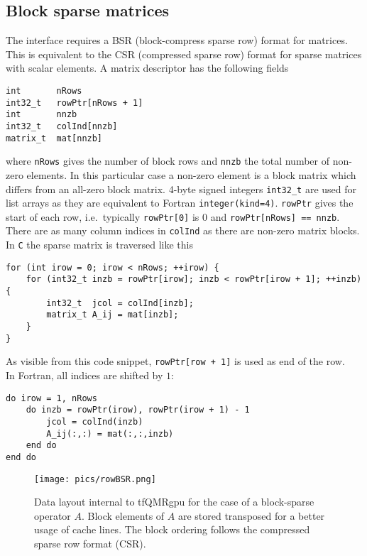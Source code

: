 \documentclass[oribibl]{llncs}
\newcommand{\ttt}[1]{\texttt{#1}}
\begin{document}
\subsection{Block sparse matrices} \label{sec:bsr}
%
The interface requires a BSR (block-compress sparse row) format for matrices.
This is equivalent to the CSR (compressed sparse row) format for sparse matrices with scalar elements.
A matrix descriptor has the following fields
\begin{verbatim}
int       nRows
int32_t   rowPtr[nRows + 1] 
int       nnzb 
int32_t   colInd[nnzb]
matrix_t  mat[nnzb]
\end{verbatim}
where \ttt{nRows} gives the number of block rows and \ttt{nnzb} the total number of non-zero elements.
In this particular case a non-zero element is a block matrix which differs from an all-zero block matrix.
4-byte signed integers \ttt{int32\_t} are used for list arrays as they are equivalent to Fortran \ttt{integer(kind=4)}.
\ttt{rowPtr} gives the start of each row, i.e.~typically \ttt{rowPtr[0]} is $0$ and \ttt{rowPtr[nRows] == nnzb}.
There are as many column indices in \ttt{colInd} as there are non-zero matrix blocks.
In \ttt{C} the sparse matrix is traversed like this
\lstset{language=C}
\begin{lstlisting}
for (int irow = 0; irow < nRows; ++irow) {
  	for (int32_t inzb = rowPtr[irow]; inzb < rowPtr[irow + 1]; ++inzb) {
		int32_t  jcol = colInd[inzb];
		matrix_t A_ij = mat[inzb];
  	}
}
\end{lstlisting}
As visible from this code snippet, \ttt{rowPtr[row + 1]} is used as end of the row.
\\
\noindent
In Fortran, all indices are shifted by $1$:
\lstset{language=Fortran}
\begin{lstlisting}
do irow = 1, nRows
	do inzb = rowPtr(irow), rowPtr(irow + 1) - 1
		jcol = colInd(inzb)
		A_ij(:,:) = mat(:,:,inzb)
	end do
end do
\end{lstlisting}


\begin{figure}
	\centering
	\texttt{[image: pics/rowBSR.png]} %
	\caption{Data layout internal to tfQMRgpu for the case of a block-sparse operator $A$. 
	Block elements of $A$ are stored transposed for a better usage of cache lines.
	The block ordering follows the compressed sparse row format (CSR).}
\end{figure}
\end{document}
